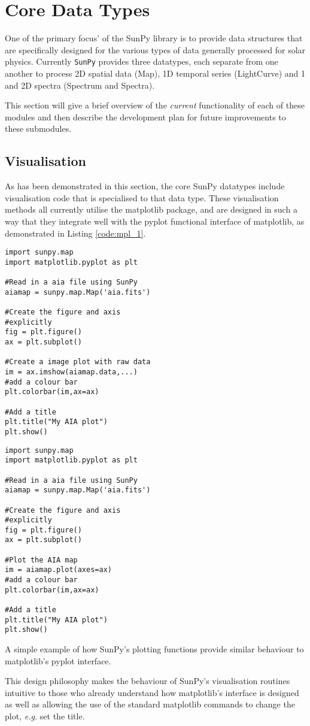 \section{Core Data Types}
One of the primary focus' of the SunPy library is to provide data structures 
that are 
specifically designed for the various types of data generally processed for 
solar physics. Currently \texttt{SunPy} provides three datatypes, each separate 
from one another to process 2D spatial data (Map), 1D temporal series 
(LightCurve) and 1 and 2D spectra (Spectrum and Spectra).

This section will give a brief overview of the \textit{current} functionality 
of each of these modules and then describe the development plan for future 
improvements to these submodules.





\subsection{Visualisation}
As has been demonstrated in this section, the core SunPy datatypes include 
visualisation code that is specialised to that data type. These visualisation 
methods all currently utilise the matplotlib package, and are designed in such 
a way that they integrate well with the pyplot functional interface of 
matplotlib, as demonstrated in Listing \ref{code:mpl_1}.

\begin{listing}[h]
\begin{minipage}{0.49\columnwidth}
\begin{verbatim}
import sunpy.map
import matplotlib.pyplot as plt

#Read in a aia file using SunPy
aiamap = sunpy.map.Map('aia.fits')

#Create the figure and axis 
#explicitly
fig = plt.figure()
ax = plt.subplot()

#Create a image plot with raw data
im = ax.imshow(aiamap.data,...)
#add a colour bar
plt.colorbar(im,ax=ax)

#Add a title
plt.title("My AIA plot")
plt.show()
\end{verbatim}
\end{minipage}
\begin{minipage}{0.49\columnwidth}
\begin{verbatim}
import sunpy.map
import matplotlib.pyplot as plt

#Read in a aia file using SunPy
aiamap = sunpy.map.Map('aia.fits')

#Create the figure and axis 
#explicitly
fig = plt.figure()
ax = plt.subplot()

#Plot the AIA map
im = aiamap.plot(axes=ax)
#add a colour bar
plt.colorbar(im,ax=ax)

#Add a title
plt.title("My AIA plot")
plt.show()
\end{verbatim}
\end{minipage}
\caption{A simple example of how SunPy's plotting functions provide similar 
behaviour to matplotlib's pyplot interface.}
\label{code:mpl_1}
\end{listing}

This design philosophy makes the behaviour of SunPy's visualisation routines 
intuitive to those who already understand how matplotlib's interface is 
designed as well as allowing the use of the standard matplotlib commands to 
change the plot, \textit{e.g.} set the title.
